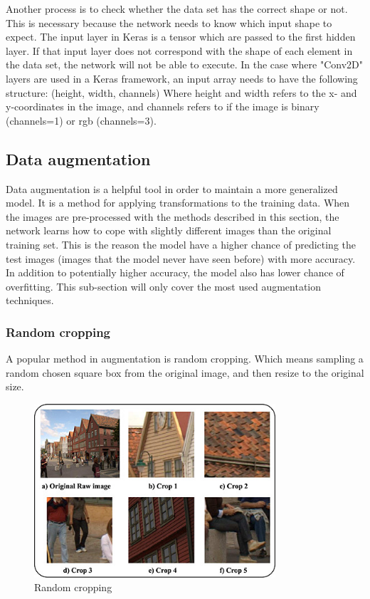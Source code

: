 \documentclass[USenglish]{ifimaster}  %
\begin{document}
Another process is to check whether the data set has the correct shape or not. This is necessary because the network needs to know which input shape to expect. The input layer in Keras is a tensor which are passed to the first hidden layer. If that input layer does not correspond with the shape of each element in the data set, the network will not be able to execute. In the case where "Conv2D" layers are used in a Keras framework, an input array needs to have the following structure:
\newline
\newline
(height, width, channels)
\newline
\newline
Where height and width refers to the x- and y-coordinates in the image, and channels refers to if the image is binary (channels=1) or \ac{rgb} (channels=3).

\subsection{Data augmentation}
Data augmentation is a helpful tool in order to maintain a more generalized model. It is a method for applying transformations to the training data. When the images are pre-processed with the methods described in this section, the network learns how to cope with slightly different images than the original training set. This is the reason the model have a higher chance of predicting the test images (images that the model never have seen before) with more accuracy. In addition to potentially higher accuracy, the model also has lower chance of overfitting. This sub-section will only cover the most used augmentation techniques.  
\subsubsection{Random cropping}
A popular method in augmentation is random cropping. Which means sampling a random chosen square box from the original image, and then resize to the original size.

\begin{figure}[H]
    \centering
    \includegraphics[width=0.8\textwidth]{bilder/random_cropping.png}
    \caption{Random cropping \cite{website:random_cropping}}
    \label{fig:random_cropping}
\end{figure}
\end{document}
